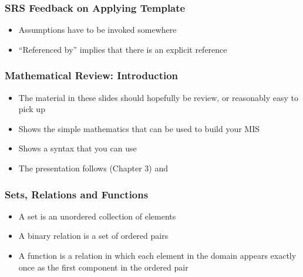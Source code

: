 \documentclass[t,12pt,numbers,fleqn]{beamer}
\begin{document}

\begin{frame}

\frametitle{SRS Feedback on Applying Template}

\begin{itemize}
\item Assumptions have to be invoked somewhere
\item ``Referenced by'' implies that there is an explicit reference
\end{itemize}
\end{frame}


\begin{frame}
\frametitle{Mathematical Review: Introduction}
\begin{itemize}
\item The material in these slides should hopefully be review, or
  reasonably easy to pick up
\item Shows the simple mathematics that can be used to build your MIS
\item Shows a syntax that you can use
\item The presentation follows \cite{HoffmanAndStrooper1995} (Chapter
  3) and \cite{GriesAndSchneider1993}
\end{itemize}
\end{frame}


\begin{frame}
\frametitle{Sets, Relations and Functions}
\begin{itemize}
\item A set is an unordered collection of elements
\item A binary relation is a set of ordered pairs
\item A function is a relation in which each element in the domain
  appears exactly once as the first component in the ordered pair
\end{itemize}
\end{frame}
\end{document}
